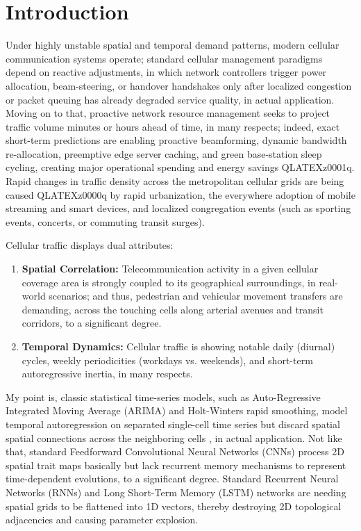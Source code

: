 \documentclass[conference]{IEEEtran}
\begin{document}
\section{Introduction}
Under highly unstable spatial and temporal demand patterns, modern cellular communication systems operate; standard cellular management paradigms depend on reactive adjustments, in which network controllers trigger power allocation, beam-steering, or handover handshakes only after localized congestion or packet queuing has already degraded service quality, in actual application. Moving on to that, proactive network resource management seeks to project traffic volume minutes or hours ahead of time, in many respects; indeed, exact short-term predictions are enabling proactive beamforming, dynamic bandwidth re-allocation, preemptive edge server caching, and green base-station sleep cycling, creating major operational spending and energy savings QLATEXz0001q. Rapid changes in traffic density across the metropolitan cellular grids are being caused QLATEXz0000q by rapid urbanization, the everywhere adoption of mobile streaming and smart devices, and localized congregation events (such as sporting events, concerts, or commuting transit surges).

Cellular traffic displays dual attributes:
\begin{enumerate}
    \item \textbf{Spatial Correlation:} Telecommunication activity in a given cellular coverage area is strongly coupled to its geographical surroundings, in real-world scenarios; and thus, pedestrian and vehicular movement transfers are demanding, across the touching cells along arterial avenues and transit corridors, to a significant degree.
    \item \textbf{Temporal Dynamics:} Cellular traffic is showing notable daily (diurnal) cycles, weekly periodicities (workdays vs. weekends), and short-term autoregressive inertia, in many respects.
\end{enumerate}

My point is, classic statistical time-series models, such as Auto-Regressive Integrated Moving Average (ARIMA) and Holt-Winters rapid smoothing, model temporal autoregression on separated single-cell time series but discard spatial spatial connections across the neighboring cells \cite{b3}, in actual application. Not like that, standard Feedforward Convolutional Neural Networks (CNNs) process 2D spatial trait maps basically but lack recurrent memory mechanisms to represent time-dependent evolutions, to a significant degree. Standard Recurrent Neural Networks (RNNs) and Long Short-Term Memory (LSTM) networks are needing spatial grids to be flattened into 1D vectors, thereby destroying 2D topological adjacencies and causing parameter explosion.
\end{document}
